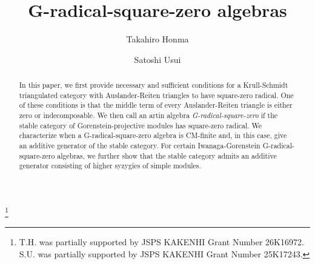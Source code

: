 \documentclass[12pt]{amsart}
\numberwithin{equation}{subsection}
\theoremstyle{plain}
\theoremstyle{definition}
\begin{document}
\title[G-radical-square-zero algebras]{G-radical-square-zero algebras}


\author[T. Honma]{Takahiro Honma}
\address{%
{\rm (T.H.)} Department of General Education \\
National Institute of Technology (KOSEN), Yuge College \\ 
Ochi \\
Ehime 794-2593\\ 
Japan}
\author[S. Usui]{Satoshi Usui}
\address{%
{\rm (S.U.)} Department of General Education \\
Tokyo Metropolitan College of Industrial Technology \\ 
8-17-1 Minamisenju, Arakawa-ku \\
Tokyo 116-8523\\ 
Japan}

\thanks{%
T.H. was partially supported by JSPS KAKENHI Grant Number 26K16972.
S.U. was partially supported by JSPS KAKENHI Grant Number 25K17243.}




\date{}

\dedicatory{}



\begin{abstract}
In this paper, we first provide necessary and sufficient conditions for a Krull-Schmidt triangulated category with Auslander-Reiten triangles to have square-zero radical.
One of these conditions is that the middle term of every Auslander-Reiten triangle is either zero or indecomposable.
We then call an artin algebra {\it G-radical-square-zero} if the stable category of Gorenstein-projective modules has square-zero radical.
We characterize when a G-radical-square-zero algebra is CM-finite and, in this case, give an additive generator of the stable category.
For certain Iwanaga-Gorenstein G-radical-square-zero algebras, we further show that the stable category admits an additive generator consisting of higher syzygies of simple modules.
\end{abstract}
\end{document}
